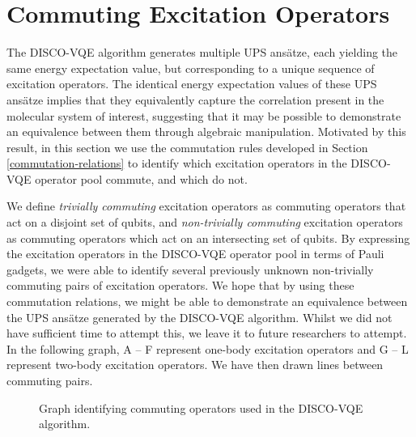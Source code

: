 \section{Commuting Excitation Operators}%
\label{operator-commutations}

The DISCO-VQE algorithm generates multiple UPS ansätze, each yielding the same energy expectation value, but corresponding to a unique sequence of excitation operators. The identical energy expectation values of these UPS ansätze implies that they equivalently capture the correlation present in the molecular system of interest, suggesting that it may be possible to demonstrate an equivalence between them through algebraic manipulation. Motivated by this result, in this section we use the commutation rules developed in Section \ref{commutation-relations} to identify which excitation operators in the DISCO-VQE operator pool commute, and which do not.

We define \textit{trivially commuting} excitation operators as commuting operators that act on a disjoint set of qubits, and \textit{non-trivially commuting} excitation operators as commuting operators which act on an intersecting set of qubits. By expressing the excitation operators in the DISCO-VQE operator pool in terms of Pauli gadgets, we were able to identify several previously unknown non-trivially commuting pairs of excitation operators. We hope that by using these commutation relations, we might be able to demonstrate an equivalence between the UPS ansätze generated by the DISCO-VQE algorithm. Whilst we did not have sufficient time to attempt this, we leave it to future researchers to attempt. In the following graph, A -- F represent one-body excitation operators and G -- L represent two-body excitation operators. We have then drawn lines between commuting pairs.

\begin{figure}[H]
    \centering
    \caption{Graph identifying commuting operators used in the DISCO-VQE algorithm.}
\end{figure}

